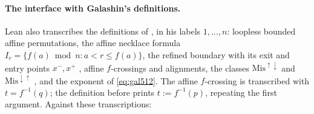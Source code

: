 \documentclass[11pt]{article}
\theoremstyle{definition}
\begin{document}
\paragraph{The interface with Galashin's definitions.}
Lean also transcribes the definitions of \cite{Galashin}, in his labels $1,\ldots,n$: loopless bounded
affine permutations, the affine necklace formula $I_r=\{f(a)\bmod n: a<r\le f(a)\}$, the refined
boundary with its exit and entry points $x^-,x^+$ \cite[Def.~1.5]{Galashin}, affine $f$-crossings and
alignments, the classes $\mathrm{Mis}^{\uparrow\downarrow}$ and $\mathrm{Mis}^{\downarrow\uparrow}$
\cite[\S5.4]{Galashin}, and the exponent of \eqref{eq:gal512}. The affine $f$-crossing is transcribed
with $t=f^{-1}(q)$; the definition before \cite[eq.~(3.2)]{Galashin} prints $t:=f^{-1}(p)$, repeating the
first argument. Against these transcriptions:
\end{document}
